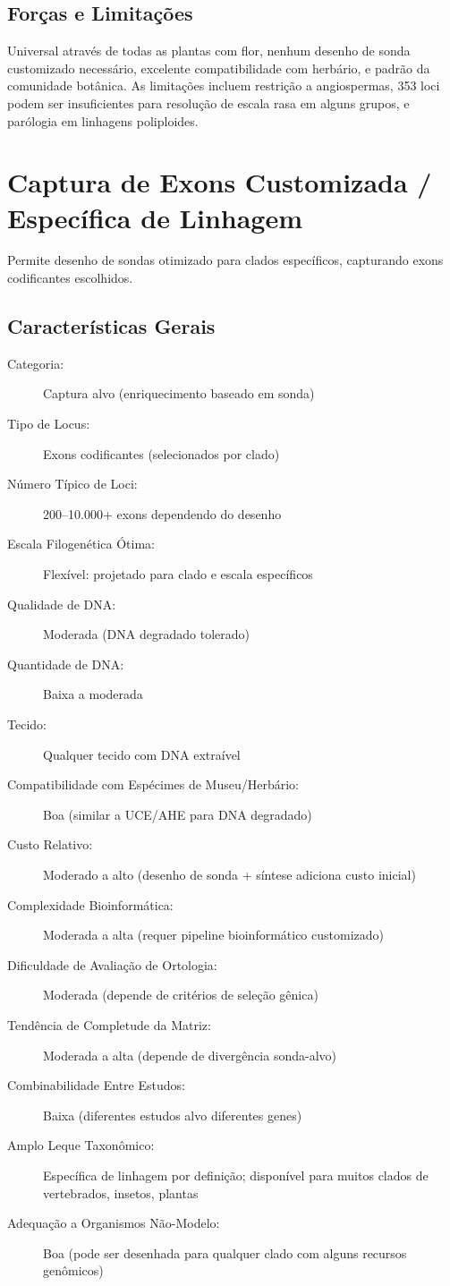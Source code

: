 \subsection{Forças e Limitações}

Universal através de todas as plantas com flor, nenhum desenho de sonda customizado necessário, excelente compatibilidade com herbário, e padrão da comunidade botânica. As limitações incluem restrição a angiospermas, 353 loci podem ser insuficientes para resolução de escala rasa em alguns grupos, e parólogia em linhagens poliploides.

\textcite{johnson2019, baker2021a, baker2021b, zuntini2024}

\section{Captura de Exons Customizada / Específica de Linhagem}

Permite desenho de sondas otimizado para clados específicos, capturando exons codificantes escolhidos.

\subsection{Características Gerais}

\begin{description}
\item[Categoria:] Captura alvo (enriquecimento baseado em sonda)
\item[Tipo de Locus:] Exons codificantes (selecionados por clado)
\item[Número Típico de Loci:] 200--10.000+ exons dependendo do desenho
\item[Escala Filogenética Ótima:] Flexível: projetado para clado e escala específicos
\item[Qualidade de DNA:] Moderada (DNA degradado tolerado)
\item[Quantidade de DNA:] Baixa a moderada
\item[Tecido:] Qualquer tecido com DNA extraível
\item[Compatibilidade com Espécimes de Museu/Herbário:] Boa (similar a UCE/AHE para DNA degradado)
\item[Custo Relativo:] Moderado a alto (desenho de sonda + síntese adiciona custo inicial)
\item[Complexidade Bioinformática:] Moderada a alta (requer pipeline bioinformático customizado)
\item[Dificuldade de Avaliação de Ortologia:] Moderada (depende de critérios de seleção gênica)
\item[Tendência de Completude da Matriz:] Moderada a alta (depende de divergência sonda-alvo)
\item[Combinabilidade Entre Estudos:] Baixa (diferentes estudos alvo diferentes genes)
\item[Amplo Leque Taxonômico:] Específica de linhagem por definição; disponível para muitos clados de vertebrados, insetos, plantas
\item[Adequação a Organismos Não-Modelo:] Boa (pode ser desenhada para qualquer clado com alguns recursos genômicos)
\end{description}

